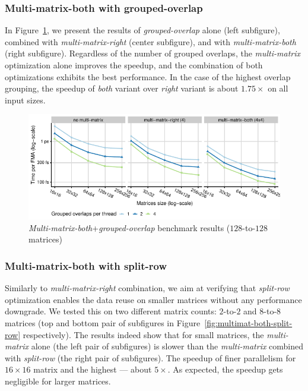 \subsubsection{Multi-matrix-both with grouped-overlap}

In Figure~\ref{fig:multimat-both-grouped-overlap}, we present the results of \emph{grouped-overlap} alone (left subfigure), combined with \emph{multi-matrix-right} (center subfigure), and with \emph{multi-matrix-both} (right subfigure). Regardless of the number of grouped overlaps, the \emph{multi-matrix} optimization alone improves the speedup, and the combination of both optimizations exhibits the best performance. In the case of the highest overlap grouping, the speedup of \emph{both} variant over \emph{right} variant is about $1.75\times$ on all input sizes.

\begin{figure}[ht]
	\centering
	\includegraphics{crosscorr/plots/n-to-m/multimat-both-grouped-overlap.pdf}
	\caption{\emph{Multi-matrix-both}+\emph{grouped-overlap} benchmark results ($128$-to-$128$ matrices)}
	\label{fig:multimat-both-grouped-overlap}
\end{figure}


\subsubsection{Multi-matrix-both with split-row}

Similarly to \emph{multi-matrix-right} combination, we aim at verifying that \emph{split-row} optimization enables the data reuse on smaller matrices without any performance downgrade. We tested this on two different matrix counts: $2$-to-$2$ and $8$-to-$8$ matrices (top and bottom pair of subfigures in Figure~\ref{fig:multimat-both-split-row} respectively). The results indeed show that for small matrices, the \emph{multi-matrix} alone (the left pair of subfigures) is slower than the \emph{multi-matrix} combined with \emph{split-row} (the right pair of subfigures). The speedup of finer parallelism for $16\times16$ matrix and the highest --- about $5\times$. As expected, the speedup gets negligible for larger matrices.

